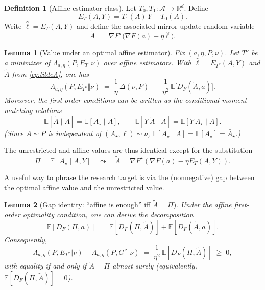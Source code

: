 \documentclass[11pt]{article}
\newcommand{\Rd}{\mathbb{R}^d}
\newcommand{\E}{\mathbb{E}}
\newcommand{\cA}{\mathcal{A}}
\newcommand{\pr}{\bar A_\star}   %
\newcommand{\po}{\Pi}           %
\theoremstyle{definition}
\newtheorem{definition}{Definition}
\theoremstyle{plain}
\newtheorem{lemma}{Lemma}
\theoremstyle{remark}
\begin{document}
\begin{definition}[Affine estimator class]
    Let $T_0,T_1:\cA\to\Rd$. Define
    \[
        E_T(A,Y)=T_1(A)\,Y+T_0(A).
    \]
    Write $\hat\ell = E_T(A,Y)$ and define the associated mirror update random variable
    \begin{equation}
        \label{eq:tildeA}
        \tilde A \;=\; \nabla F^\star\!\big(\nabla F(a)-\eta \hat\ell\big).
    \end{equation}
\end{definition}

\begin{lemma}[Value under an optimal affine estimator]
    \label{lem:affine-value}
    Fix $(a,\eta,P,\nu)$. Let $T^\nu$ be a minimizer of $\Lambda_{a,\eta}(P,E_T\Vert\nu)$ over affine estimators.
    With $\hat\ell=E_{T^\nu}(A,Y)$ and $\tilde A$ from \eqref{eq:tildeA}, one has
    \begin{equation}
        \label{eq:Lambda-affine}
        \Lambda_{a,\eta}(P,E_{T^\nu}\Vert\nu)
        \;=\;
        \frac{1}{\eta}\,\Delta(\nu,P)
        \;-\;
        \frac{1}{\eta^2}\,\E\!\big[D_F(\tilde A,a)\big].
    \end{equation}
    Moreover, the first-order conditions can be written as the conditional moment-matching relations
    \[
        \E[\tilde A \mid A]=\E[A_\star\mid A],\qquad
        \E[Y\,\tilde A \mid A]=\E[Y\,A_\star\mid A].
    \]
    (Since $A\sim P$ is independent of $(A_\star,\ell)\sim\nu$, $\E[A_\star\mid A]=\E[A_\star]=\pr$.)
\end{lemma}

The unrestricted and affine values are thus identical except for the substitution
\[
    \po=\E[A_\star\mid A,Y]
    \quad\leadsto\quad
    \tilde A=\nabla F^\star(\nabla F(a)-\eta E_T(A,Y)).
\]

A useful way to phrase the research target is via the (nonnegative) gap between the optimal affine value and the unrestricted value.

\begin{lemma}[Gap identity: ``affine is enough'' iff $\tilde A=\po$]
    \label{lem:gap}
    Under the affine first-order optimality condition, one can derive the decomposition
    \[
        \E[D_F(\po,a)] \;=\; \E[D_F(\po,\tilde A)] + \E[D_F(\tilde A,a)].
    \]
    Consequently,
    \[
        \Lambda_{a,\eta}(P,E_{T^\nu}\Vert\nu)-\Lambda_{a,\eta}(P,G^\nu\Vert\nu)
        \;=\;
        \frac{1}{\eta^2}\,\E[D_F(\po,\tilde A)]
        \;\ge\;0,
    \]
    with equality if and only if $\tilde A=\po$ almost surely (equivalently, $\E[D_F(\po,\tilde A)]=0$).
\end{lemma}
\end{document}
